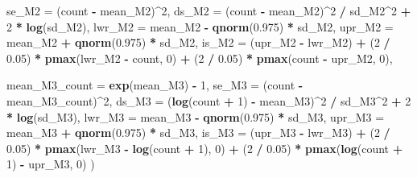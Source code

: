 \documentclass[
]{article}
\newenvironment{Shaded}{\begin{snugshade}}{\end{snugshade}}
\newcommand{\AttributeTok}[1]{\textcolor[rgb]{0.13,0.29,0.53}{#1}}
\newcommand{\DecValTok}[1]{\textcolor[rgb]{0.00,0.00,0.81}{#1}}
\newcommand{\FloatTok}[1]{\textcolor[rgb]{0.00,0.00,0.81}{#1}}
\newcommand{\FunctionTok}[1]{\textcolor[rgb]{0.13,0.29,0.53}{\textbf{#1}}}
\newcommand{\NormalTok}[1]{#1}
\newcommand{\SpecialCharTok}[1]{\textcolor[rgb]{0.81,0.36,0.00}{\textbf{#1}}}
\begin{document}
\begin{Shaded}
\begin{Highlighting}[]
    \AttributeTok{se\_M2 =}\NormalTok{ (count }\SpecialCharTok{{-}}\NormalTok{ mean\_M2)}\SpecialCharTok{\^{}}\DecValTok{2}\NormalTok{,}
    \AttributeTok{ds\_M2 =}\NormalTok{ (count }\SpecialCharTok{{-}}\NormalTok{ mean\_M2)}\SpecialCharTok{\^{}}\DecValTok{2} \SpecialCharTok{/}\NormalTok{ sd\_M2}\SpecialCharTok{\^{}}\DecValTok{2} \SpecialCharTok{+} \DecValTok{2} \SpecialCharTok{*} \FunctionTok{log}\NormalTok{(sd\_M2),}
    \AttributeTok{lwr\_M2 =}\NormalTok{ mean\_M2 }\SpecialCharTok{{-}} \FunctionTok{qnorm}\NormalTok{(}\FloatTok{0.975}\NormalTok{) }\SpecialCharTok{*}\NormalTok{ sd\_M2,}
    \AttributeTok{upr\_M2 =}\NormalTok{ mean\_M2 }\SpecialCharTok{+} \FunctionTok{qnorm}\NormalTok{(}\FloatTok{0.975}\NormalTok{) }\SpecialCharTok{*}\NormalTok{ sd\_M2,}
    \AttributeTok{is\_M2 =}\NormalTok{ (upr\_M2 }\SpecialCharTok{{-}}\NormalTok{ lwr\_M2) }\SpecialCharTok{+}
\NormalTok{      (}\DecValTok{2} \SpecialCharTok{/} \FloatTok{0.05}\NormalTok{) }\SpecialCharTok{*} \FunctionTok{pmax}\NormalTok{(lwr\_M2 }\SpecialCharTok{{-}}\NormalTok{ count, }\DecValTok{0}\NormalTok{) }\SpecialCharTok{+}
\NormalTok{      (}\DecValTok{2} \SpecialCharTok{/} \FloatTok{0.05}\NormalTok{) }\SpecialCharTok{*} \FunctionTok{pmax}\NormalTok{(count }\SpecialCharTok{{-}}\NormalTok{ upr\_M2, }\DecValTok{0}\NormalTok{),}
    
    \AttributeTok{mean\_M3\_count =} \FunctionTok{exp}\NormalTok{(mean\_M3) }\SpecialCharTok{{-}} \DecValTok{1}\NormalTok{,}
    \AttributeTok{se\_M3 =}\NormalTok{ (count }\SpecialCharTok{{-}}\NormalTok{ mean\_M3\_count)}\SpecialCharTok{\^{}}\DecValTok{2}\NormalTok{,}
    \AttributeTok{ds\_M3 =}\NormalTok{ (}\FunctionTok{log}\NormalTok{(count }\SpecialCharTok{+} \DecValTok{1}\NormalTok{) }\SpecialCharTok{{-}}\NormalTok{ mean\_M3)}\SpecialCharTok{\^{}}\DecValTok{2} \SpecialCharTok{/}\NormalTok{ sd\_M3}\SpecialCharTok{\^{}}\DecValTok{2} \SpecialCharTok{+} \DecValTok{2} \SpecialCharTok{*} \FunctionTok{log}\NormalTok{(sd\_M3),}
    \AttributeTok{lwr\_M3 =}\NormalTok{ mean\_M3 }\SpecialCharTok{{-}} \FunctionTok{qnorm}\NormalTok{(}\FloatTok{0.975}\NormalTok{) }\SpecialCharTok{*}\NormalTok{ sd\_M3,}
    \AttributeTok{upr\_M3 =}\NormalTok{ mean\_M3 }\SpecialCharTok{+} \FunctionTok{qnorm}\NormalTok{(}\FloatTok{0.975}\NormalTok{) }\SpecialCharTok{*}\NormalTok{ sd\_M3,}
    \AttributeTok{is\_M3 =}\NormalTok{ (upr\_M3 }\SpecialCharTok{{-}}\NormalTok{ lwr\_M3) }\SpecialCharTok{+}
\NormalTok{      (}\DecValTok{2} \SpecialCharTok{/} \FloatTok{0.05}\NormalTok{) }\SpecialCharTok{*} \FunctionTok{pmax}\NormalTok{(lwr\_M3 }\SpecialCharTok{{-}} \FunctionTok{log}\NormalTok{(count }\SpecialCharTok{+} \DecValTok{1}\NormalTok{), }\DecValTok{0}\NormalTok{) }\SpecialCharTok{+}
\NormalTok{      (}\DecValTok{2} \SpecialCharTok{/} \FloatTok{0.05}\NormalTok{) }\SpecialCharTok{*} \FunctionTok{pmax}\NormalTok{(}\FunctionTok{log}\NormalTok{(count }\SpecialCharTok{+} \DecValTok{1}\NormalTok{) }\SpecialCharTok{{-}}\NormalTok{ upr\_M3, }\DecValTok{0}\NormalTok{)}
\NormalTok{  )}


\end{Highlighting}
\end{Shaded}
\end{document}

